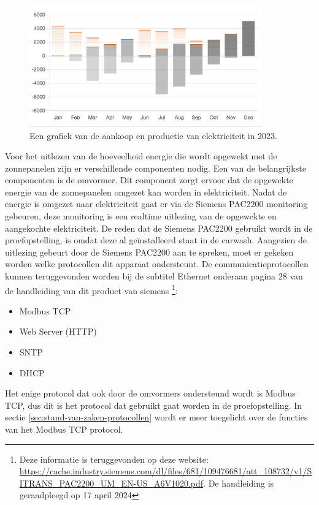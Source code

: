 \begin{figure}[h]
    \includegraphics[width=10cm]{./graphics/Energie-opbrengsten-2023}
    \caption{Een grafiek van de aankoop en productie van elektriciteit in 2023.}
    \label{fig:energie-productie-2023}
\end{figure}

Voor het uitlezen van de hoeveelheid energie die wordt opgewekt met de zonnepanelen zijn er verschillende componenten nodig. Een van de belangrijkste componenten is de omvormer. Dit component zorgt ervoor dat de opgewekte energie van de zonnepanelen omgezet kan worden in elektriciteit. Nadat de energie is omgezet naar elektriciteit gaat er via de Siemens PAC2200 monitoring gebeuren, deze monitoring is een realtime uitlezing van de opgewekte en aangekochte elektriciteit. De reden dat de Siemens PAC2200 gebruikt wordt in de proefopstelling, is omdat deze al geïnstalleerd staat in de carwash. Aangezien de uitlezing gebeurt door de Siemens PAC2200 aan te spreken, moet er gekeken worden welke protocollen dit apparaat ondersteunt. De communicatieprotocollen  kunnen teruggevonden worden bij de subtitel Ethernet onderaan pagina 28 van de handleiding van dit product van siemens \footnote{Deze informatie is teruggevonden op deze website: \url{https://cache.industry.siemens.com/dl/files/681/109476681/att_108732/v1/SITRANS_PAC2200_UM_EN-US_A6V1020.pdf}. De handleiding is geraadpleegd op 17 april 2024}:

\begin{itemize}
    \item Modbus TCP
    \item Web Server (HTTP)
    \item SNTP
    \item DHCP
\end{itemize}

Het enige protocol dat ook door de omvormers ondersteund wordt is Modbus TCP, dus dit is het protocol dat gebruikt gaat worden in de proefopstelling. In sectie \ref{sec:stand-van-zaken-protocollen} wordt er meer toegelicht over de functies van het Modbus TCP protocol.\\

